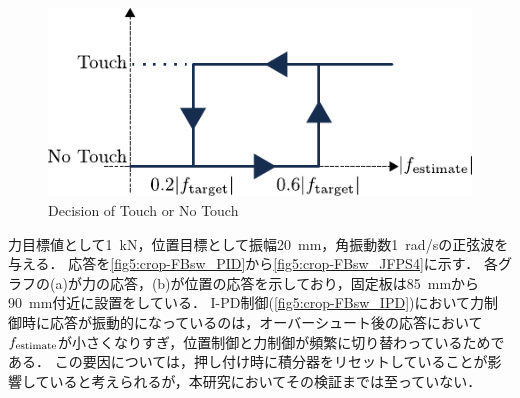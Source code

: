 \begin{figure}[t]
    \centering
        \includegraphics[keepaspectratio, scale=1.0]{contents/IntegrationControl/figure/touch_define.pdf}
        \caption{Decision of Touch or No Touch}
        \label{fig5:touch_define}
\end{figure}

力目標値として\SI{1}{kN}，位置目標として振幅\SI{20}{mm}，角振動数\SI{1}{rad/s}の正弦波を与える．
応答を\figname\ref{fig5:crop-FBsw_PID}から\figname\ref{fig5:crop-FBsw_JFPS4}に示す．
各グラフの(a)が力の応答，(b)が位置の応答を示しており，固定板は\SI{85}{mm}から\SI{90}{mm}付近に設置をしている．
I-PD制御(\figname\ref{fig5:crop-FBsw_IPD})において力制御時に応答が振動的になっているのは，オーバーシュート後の応答において$f_\mathrm{estimate}$が小さくなりすぎ，位置制御と力制御が頻繁に切り替わっているためである．
この要因については，押し付け時に積分器をリセットしていることが影響していると考えられるが，本研究においてその検証までは至っていない．

